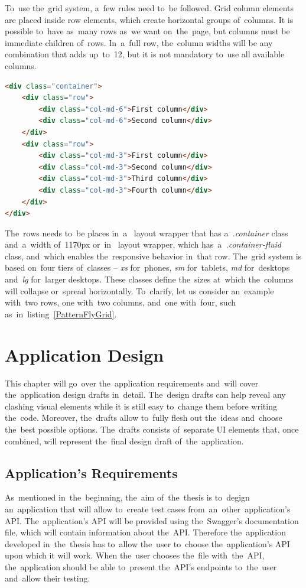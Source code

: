 To~use the~grid system, a~few rules need to~be followed. Grid column elements
are placed inside row elements, which create horizontal groups of~columns. It is
possible to~have as~many rows as~we want on~the~page, but columns must be
immediate children of~rows. In~a~full row, the~column widths will be any
combination that adds up~to~12, but it is not mandatory to~use all available
columns.

\vspace{2mm}
\begin{lstlisting}[caption=An~example of~the~grid system
in~PatternFly.,label=PatternFlyGrid,language=HTML]
<div class="container">
	<div class="row">
		<div class="col-md-6">First column</div>
		<div class="col-md-6">Second column</div>
	</div>
	<div class="row">
		<div class="col-md-3">First column</div>
		<div class="col-md-3">Second column</div>
		<div class="col-md-3">Third column</div>
		<div class="col-md-3">Fourth column</div>
	</div>
</div>
\end{lstlisting}
  
The~rows needs to~be places in~a~ layout wrapper that has
a~\textit{.container} class and~a~width of~1170px or~in~ layout
wrapper, which has~a~\textit{.container-fluid} class, and~which enables
the~responsive behavior in~that row. The~grid system is based on~four tiers
of~classes -- \textit{xs} for~phones, \textit{sm} for~tablets, \textit{md}
for~desktops and~\textit{lg} for~larger desktops. These classes define the~sizes
at~which the~columns will collapse or~spread horizontally. To~clarify, let us
consider an~example with~two rows, one with~two columns, and~one with~four, such
as~in~listing~\ref{PatternFlyGrid}.




\chapter{Application Design}
\label{Design}
This chapter will go~over the~application requirements and~will cover
the~application design drafts in~detail. The~design drafts can help reveal any
clashing visual elements while it is still easy to~change them before writing
the~code. Moreover, the~drafts allow to~fully flesh out the~ideas and~choose
the~best possible options. The~drafts consists of~separate UI elements that,
once combined, will represent the~final design draft of~the~application.

\section{Application's Requirements}
As~mentioned in~the~beginning, the~aim of~the~thesis is to~degign an~application
that will allow to~create test cases from~an~other~application's API.
The~application's API will be provided using the~Swagger's documentation file,
which will contain information about the~API. Therefore the~application
developed in~the~thesis has to~allow the~user to~choose the~application's API
upon which it will work. When the~user chooses the~file with~the~API,
the~application should be able to~present the~API's endpoints to~the~user
and~allow their testing. 

